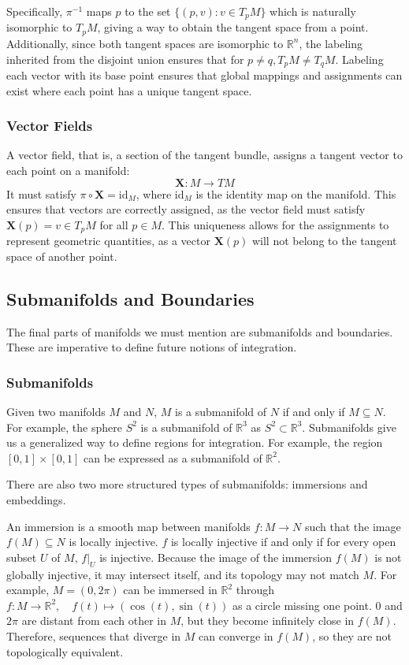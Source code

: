 \documentclass[12pt]{article}
\newcommand{\R}{\mathbb{R}}
\newcommand{\at}[2]{\left. #1 \right|_{#2}}
\newcommand{\bv}[1]{\mathbf{#1}}
\begin{document}
Specifically, $\pi^{-1}$ maps $p$ to the set $\{(p,v) : v \in T_pM\}$ which is naturally isomorphic to $T_pM$, giving a way to obtain the tangent space from a point. Additionally, since both tangent spaces are isomorphic to $\R^n$, the labeling inherited from the disjoint union ensures that for $p \neq q, T_pM \neq T_qM$. Labeling each vector with its base point ensures that global mappings and assignments can exist where each point has a unique tangent space. 

\subsubsection{Vector Fields}
A vector field, that is, a section of the tangent bundle, assigns a tangent vector to each point on a manifold: 
\[
\bv{X}:M\to TM
\]
It must satisfy $\pi \circ \bv{X} = \text{id}_M$, where $\text{id}_M$ is the identity map on the manifold. This ensures that vectors are correctly assigned, as the vector field must satisfy $\bv{X}(p)= v\in T_pM$ for all $p \in M$. This uniqueness allows for the assignments to represent geometric quantities, as a vector $\bv{X}(p)$ will not belong to the tangent space of another point.

\subsection{Submanifolds and Boundaries}
The final parts of manifolds we must mention are submanifolds and boundaries. These are imperative to define future notions of integration.

\subsubsection{Submanifolds}

Given two manifolds $M$ and $N$, $M$ is a submanifold of $N$ if and only if $M \subseteq N$. For example, the sphere $S^2$ is a submanifold of $\R^3$ as $S^2 \subset \R^3$. Submanifolds give us a generalized way to define regions for integration. For example, the region $[0,1] \times [0,1]$ can be expressed as a submanifold of $\R^2$. 

There are also two more structured types of submanifolds: immersions and embeddings. 

An immersion is a smooth map between manifolds $f:M \to N$ such that the image $f(M) \subseteq N$ is locally injective. 
$f$ is locally injective if and only if for every open subset $U$ of $M$, $\at{f}{U}$ is injective. 
Because the image of the immersion $f(M)$ is not globally injective, it may intersect itself, and its topology may not match $M$. For example, $M = (0,2\pi)$ can be immersed in $\R^2$ through $f:M \to \R^2, \quad f(t) \mapsto (\cos(t),\sin(t))$ as a circle missing one point. $0$ and $2\pi$ are distant from each other in $M$, but they become infinitely close in $f(M)$. Therefore, sequences that diverge in $M$ can converge in $f(M)$, so they are not topologically equivalent.
\end{document}
